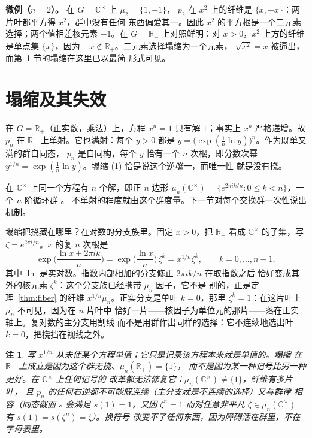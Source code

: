 \documentclass[submission,noinfoline]{jsfds}
\newtheorem*{remark}{注}
\begin{document}
\textbf{微例（$n=2$）。} 在 $G=\mathbb C^\times$ 上 $\mu_2=\{1,-1\}$，
$p_2$ 在 $x^2$ 上的纤维是 $\{x,-x\}$：两片叶都平方得 $x^2$，群中没有任何
东西偏爱其一。因此 $x^2$ 的平方根是一个二元素选择；两个值相差核元素
$-1$。在 $G=\mathbb R_+$ 上对照鲜明：对 $x>0$，$x^2$ 上方的纤维是单点集
$\{x\}$，因为 $-x\notin\mathbb R_+$。二元素选择塌缩为一个元素，
$\sqrt{x^2}=x$ 被逼出，而第~\ref{sec:collapse} 节的塌缩在这里已以最简
形式可见。

\section{塌缩及其失效}\label{sec:collapse}

在 $G=\mathbb R_+$（正实数，乘法）上，方程 $x^n=1$ 只有解 $1$；事实上
$x^n$ 严格递增。故 $p_n$ 在 $\mathbb R_+$ 上单射。它也满射：每个 $y>0$
都是 $y=\bigl(\exp(\tfrac1n\ln y)\bigr)^n$。作为既单又满的群自同态，
$p_n$ 是自同构，每个 $y$ 恰有一个 $n$ 次根，即分数次幂
$y^{1/n}=\exp(\tfrac1n\ln y)$。塌缩 (1) 恰是说这个逆\emph{唯一}，而唯一性
就是没有挠。

在 $\mathbb C^\times$ 上同一个方程有 $n$ 个解，即正 $n$ 边形
$\mu_n(\mathbb C^\times)=\{e^{2\pi i k/n}:0\le k<n\}$，一个 $n$ 阶循环群
\citep{Gauss1801}。
不单射的程度就由这个群度量。下一节对每个交换群一次性说出机制。

塌缩把挠藏在哪里？在对数的分支族里。固定 $x>0$，把 $\mathbb R_+$ 看成
$\mathbb C^\times$ 的子集，写 $\zeta=e^{2\pi i/n}$。$x$ 的复 $n$ 次根是
\[
  \exp\!\Big(\frac{\ln x+2\pi i k}{n}\Big)
  =\exp\!\Big(\frac{\ln x}{n}\Big)\,\zeta^k
  =x^{1/n}\zeta^k,\qquad k=0,\dots,n-1,
\]
其中 $\ln$ 是实对数。指数内部相加的分支修正 $2\pi i k/n$ 在取指数之后
恰好变成其外的核元素 $\zeta^k$：这个分支族已经携带 $\mu_n$ 因子，它不是
别的，正是定理~\ref{thm:fiber} 的纤维 $x^{1/n}\mu_n$。正实分支是单叶
$k=0$，那里 $\zeta^k=1$：在这片叶上 $\mu_n$ 不可见，因为在 $n$ 片叶中
恰好一片——核因子为单位元的那片——落在正实轴上。复对数的主分支用割线
而不是用群作出同样的选择：它不连续地选出叶 $k=0$，把挠挡在视线之外。

\begin{remark}
写 $x^{1/n}$ 从未使某个方程单值；它只是记录该方程本来就是单值的。塌缩
在 $\mathbb R_+$ 上成立是因为这个群无挠、$\mu_n(\mathbb R_+)=\{1\}$，
而不是因为某一种记号比另一种更好。在 $\mathbb C^\times$ 上任何记号的
改革都无法修复它：$\mu_n(\mathbb C^\times)\ne\{1\}$，纤维有多片叶，
且 $p_n$ 的任何右逆都不可能既连续（主分支就是不连续的选择）又与群律
相容（同态截面 $s$ 会满足 $s(1)=1$，又因 $\zeta^n=1$ 而对任意非平凡
$\zeta\in\mu_n(\mathbb C^\times)$ 有 $s(1)=s(\zeta^n)=\zeta$）。换符号
改变不了任何东西，因为障碍活在群里，不在字母表里。
\end{remark}
\end{document}
